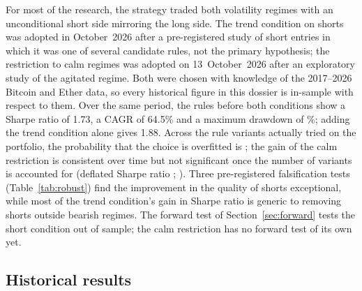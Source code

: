 \documentclass[11pt,a4paper]{article}
\newcommand{\minus}{\textminus}
\begin{document}
\begin{discbox}
For most of the research, the strategy traded both volatility regimes with an unconditional short side mirroring the long side.
The trend condition on shorts was adopted in October~2026 after a pre-registered study of short entries in which it was one of
several candidate rules, not the primary hypothesis; the restriction to calm regimes was adopted on 13~October~2026 after an
exploratory study of the agitated regime. Both were chosen with knowledge of the 2017--2026 Bitcoin and Ether data, so every
historical figure in this dossier is in-sample with respect to them. Over the same period, the rules before both conditions show a
Sharpe ratio of 1.73, a CAGR of 64.5\% and a maximum drawdown of \minus23.5\%; adding the trend condition alone gives 1.88.
Across the \PboN{} rule variants actually tried on the portfolio, the probability that the choice is overfitted is \Pbo{}
\citep{baileyetal2017}; the gain of the calm restriction is consistent over time but not significant once the number of variants
is accounted for (deflated Sharpe ratio \GainDsr; \citealp{bailey2014}). Three pre-registered falsification tests (Table~\ref{tab:robust}) find the
improvement in the quality of shorts exceptional, while most of the trend condition's gain in Sharpe ratio is generic to removing
shorts outside bearish regimes. The forward test of Section~\ref{sec:forward} tests the short condition out of sample; the calm
restriction has no forward test of its own yet.
\end{discbox}

\subsection{Historical results}
\end{document}
